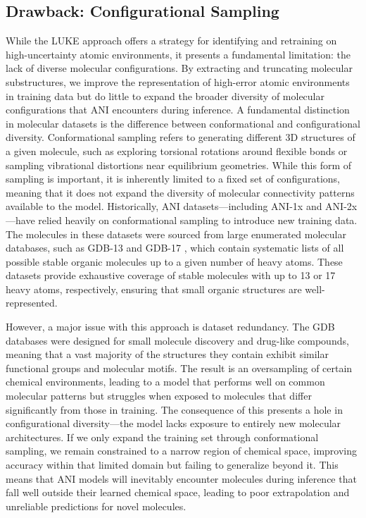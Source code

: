 \subsection{Drawback: Configurational Sampling}
\label{subsec:drawback_config_sampling}

While the LUKE approach offers a strategy for identifying and retraining on high-uncertainty atomic environments, it presents a fundamental limitation: the lack of diverse molecular configurations. 
By extracting and truncating molecular substructures, we improve the representation of high-error atomic environments in training data but do little to expand the broader diversity of molecular configurations that ANI encounters during inference. 
A fundamental distinction in molecular datasets is the difference between conformational and configurational diversity. 
Conformational sampling refers to generating different 3D structures of a given molecule, such as exploring torsional rotations around flexible bonds or sampling vibrational distortions near equilibrium geometries. While this form of sampling is important, it is inherently limited to a fixed set of configurations, meaning that it does not expand the diversity of molecular connectivity patterns available to the model.
Historically, ANI datasets—including ANI-1x \cite{1x_1ccx_datasets} and ANI-2x \cite{2x_dataset}—have relied heavily on conformational sampling to introduce new training data.
The molecules in these datasets were sourced from large enumerated molecular databases, such as GDB-13 \cite{gdb-13} and GDB-17 \cite{gdb-17}, which contain systematic lists of all possible stable organic molecules up to a given number of heavy atoms.
These datasets provide exhaustive coverage of stable molecules with up to 13 or 17 heavy atoms, respectively, ensuring that small organic structures are well-represented.

However, a major issue with this approach is dataset redundancy. 
The GDB databases were designed for small molecule discovery and drug-like compounds, meaning that a vast majority of the structures they contain exhibit similar functional groups and molecular motifs. 
The result is an oversampling of certain chemical environments, leading to a model that performs well on common molecular patterns but struggles when exposed to molecules that differ significantly from those in training. 
The consequence of this presents a hole in configurational diversity—the model lacks exposure to entirely new molecular architectures. 
If we only expand the training set through conformational sampling, we remain constrained to a narrow region of chemical space, improving accuracy within that limited domain but failing to generalize beyond it.
This means that ANI models will inevitably encounter molecules during inference that fall well outside their learned chemical space, leading to poor extrapolation and unreliable predictions for novel molecules.

